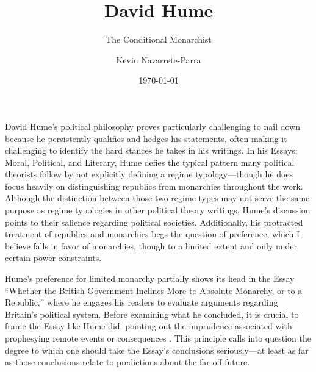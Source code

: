 \documentclass[authordate]{turabian-researchpaper}
\title{David Hume}
\subtitle{The Conditional Monarchist}
\author{Kevin Navarrete-Parra}
\date{\today}
\begin{document}
\maketitle




\autocite[93]{Hume_1985}

David Hume’s political philosophy proves particularly challenging to nail down because he persistently qualifies and hedges his statements, often making it challenging to identify the hard stances he takes in his writings. In his Essays: Moral, Political, and Literary, Hume defies the typical pattern many political theorists follow by not explicitly defining a regime typology—though he does focus heavily on distinguishing republics from monarchies throughout the work. Although the distinction between those two regime types may not serve the same purpose as regime typologies in other political theory writings, Hume’s discussion points to their salience regarding political societies. Additionally, his protracted treatment of republics and monarchies begs the question of preference, which I believe falls in favor of monarchies, though to a limited extent and only under certain power constraints. 

Hume’s preference for limited monarchy partially shows its head in the Essay “Whether the British Government Inclines More to Absolute Monarchy, or to a Republic,” where he engages his readers to evaluate arguments regarding Britain’s political system. Before examining what he concluded, it is crucial to frame the Essay like Hume did: pointing out the imprudence associated with prophesying remote events or consequences \autocite[47]{Hume_1985}. This principle calls into question the degree to which one should take the Essay’s conclusions seriously—at least as far as those conclusions relate to predictions about the far-off future. 
\end{document}

